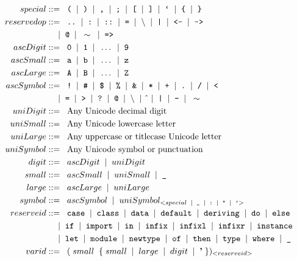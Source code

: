 \begin{align*}
	special &::=\tav \ttt{(} \alt \ttt{)} \alt \ttt{,} \alt \ttt{;} \alt \ttt{[} \alt \ttt{]} \alt \ttt{`} \alt \ttt{\{} \alt \ttt{\}}\\
	reservedop  &::=\tav \ttt{..} \alt \ttt{:} \alt \ttt{::} \alt \ttt{=} \alt \backslash \alt \ttt{|} \alt \ttt{<-} \alt \ttt{->} \\
	&\tab \alt \ttt{@} \alt \sim \alt \ttt{=>}\\
	ascDigit    &::=\tav     \ttt{0} \alt \ttt{1} \alt \ldots \alt \ttt{9}\\
	ascSmall    &::=\tav     \ttt{a} \alt \ttt{b} \alt \ldots \alt \ttt{z}\\
	ascLarge    &::=\tav     \ttt{A} \alt \ttt{B} \alt \ldots \alt \ttt{Z}\\
	ascSymbol   &::=\tav     \ttt{!} \alt \ttt{\#} \alt \ttt{\$} \alt \ttt{\%} \alt \ttt{\&} \alt \ttt{*} \alt \ttt{+} \alt \ttt{.} \alt \ttt{/} \alt \ttt{<} \\
	&\tab \alt \ttt{=} \alt \ttt{>} \alt \ttt{?} \alt \ttt{@} \alt \backslash \alt \hat{} \alt \ttt{|} \alt \ttt{-} \alt \sim \\
	uniDigit    &::=\tav     \text{Any Unicode decimal digit}\\
	uniSmall    &::=\tav     \text{Any Unicode lowercase letter}\\
	uniLarge    &::=\tav     \text{Any uppercase or titlecase Unicode letter}\\
	uniSymbol   &::=\tav     \text{Any Unicode symbol or punctuation}\\
	digit       &::=\tav     ascDigit \alt uniDigit\\
	small       &::=\tav     ascSmall \alt uniSmall \alt \ttt{\_}\\
	large       &::=\tav ascLarge \alt uniLarge \\
	symbol      &::=\tav ascSymbol \alt uniSymbol_{< special \alt \ttt{\_} \alt \ttt{:} \alt \ttt{"} \alt \ttt{'} >} \\
	reserveid   &::= \tav \ttt{case} \alt \ttt{class} \alt \ttt{data} \alt \ttt{default} \alt \ttt{deriving} \alt \ttt{do} \alt \ttt{else} \\
	&\tab \alt \ttt{if} \alt \ttt{import} \alt \ttt{in} \alt \ttt{infix} \alt \ttt{infixl} \alt \ttt{infixr} \alt \ttt{instance} \\
	&\tab \alt \ttt{let} \alt \ttt{module} \alt \ttt{newtype} \alt \ttt{of} \alt \ttt{then} \alt \ttt{type} \alt \ttt{where} \alt \ttt{\_} \\
	varid       &::= \tav ( \; small \tav \{ \; small \alt large \alt digit \alt \textbf{'} \; \} )_{< reserveid >}\\

\end{align*}
